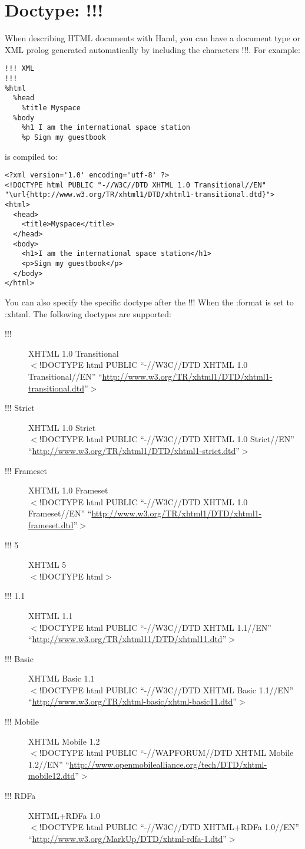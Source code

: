 \documentclass[9pt]{article}
\begin{document}
\section{Doctype: !!!}


 When describing HTML documents with Haml, you can have a document type or XML prolog generated automatically by including the characters !!!. For example:
\begin{verbatim}
!!! XML
!!!
%html
  %head
    %title Myspace
  %body
    %h1 I am the international space station
    %p Sign my guestbook
\end{verbatim}


 is compiled to:
\begin{verbatim}
<?xml version='1.0' encoding='utf-8' ?>
<!DOCTYPE html PUBLIC "-//W3C//DTD XHTML 1.0 Transitional//EN" "\url{http://www.w3.org/TR/xhtml1/DTD/xhtml1-transitional.dtd}">
<html>
  <head>
    <title>Myspace</title>
  </head>
  <body>
    <h1>I am the international space station</h1>
    <p>Sign my guestbook</p>
  </body>
</html>
\end{verbatim}


 You can also specify the specific doctype after the !!! When the :format is set to :xhtml. The following doctypes are supported:
\begin{description}
\item[!!!]XHTML 1.0 Transitional\\ 
$<$!DOCTYPE html PUBLIC ``-//W3C//DTD XHTML 1.0 Transitional//EN'' ``\url{http://www.w3.org/TR/xhtml1/DTD/xhtml1-transitional.dtd}''$>$
\item[!!! Strict]XHTML 1.0 Strict\\ 
$<$!DOCTYPE html PUBLIC ``-//W3C//DTD XHTML 1.0 Strict//EN'' ``\url{http://www.w3.org/TR/xhtml1/DTD/xhtml1-strict.dtd}''$>$
\item[!!! Frameset]XHTML 1.0 Frameset\\ 
$<$!DOCTYPE html PUBLIC ``-//W3C//DTD XHTML 1.0 Frameset//EN'' ``\url{http://www.w3.org/TR/xhtml1/DTD/xhtml1-frameset.dtd}''$>$
\item[!!! 5]XHTML 5\\ 
$<$!DOCTYPE html$>$\\ 

\item[!!! 1.1]XHTML 1.1\\ 
$<$!DOCTYPE html PUBLIC ``-//W3C//DTD XHTML 1.1//EN'' ``\url{http://www.w3.org/TR/xhtml11/DTD/xhtml11.dtd}''$>$
\item[!!! Basic]XHTML Basic 1.1\\ 
$<$!DOCTYPE html PUBLIC ``-//W3C//DTD XHTML Basic 1.1//EN'' ``\url{http://www.w3.org/TR/xhtml-basic/xhtml-basic11.dtd}''$>$ 
\item[!!! Mobile]XHTML Mobile 1.2\\ 
$<$!DOCTYPE html PUBLIC ``-//WAPFORUM//DTD XHTML Mobile 1.2//EN'' ``\url{http://www.openmobilealliance.org/tech/DTD/xhtml-mobile12.dtd}''$>$
\item[!!! RDFa]XHTML+RDFa 1.0\\ 
$<$!DOCTYPE html PUBLIC ``-//W3C//DTD XHTML+RDFa 1.0//EN'' ``\url{http://www.w3.org/MarkUp/DTD/xhtml-rdfa-1.dtd}''$>$

\end{description}
\end{document}
